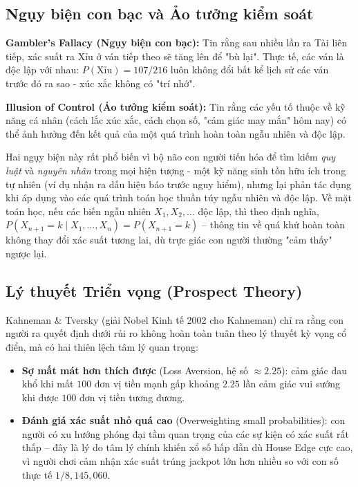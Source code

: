 \documentclass[12pt,a4paper]{article}
\theoremstyle{coloredthm}
\theoremstyle{coloreddef}
\theoremstyle{remark}
\begin{document}
\subsection{Ngụy biện con bạc và Ảo tưởng kiểm soát}

\textbf{Gambler's Fallacy (Ngụy biện con bạc):} Tin rằng sau nhiều lần ra Tài liên tiếp, xác suất ra Xỉu ở ván tiếp theo sẽ tăng lên để "bù lại". Thực tế, các ván là độc lập với nhau: $P(\text{Xỉu}) = 107/216$ luôn không đổi bất kể lịch sử các ván trước đó ra sao - xúc xắc không có "trí nhớ".

\textbf{Illusion of Control (Ảo tưởng kiểm soát):} Tin rằng các yếu tố thuộc về kỹ năng cá nhân (cách lắc xúc xắc, cách chọn số, "cảm giác may mắn" hôm nay) có thể ảnh hưởng đến kết quả của một quá trình hoàn toàn ngẫu nhiên và độc lập.

\begin{giaithich}
Hai ngụy biện này rất phổ biến vì bộ não con người tiến hóa để tìm kiếm \emph{quy luật} và \emph{nguyên nhân} trong mọi hiện tượng - một kỹ năng sinh tồn hữu ích trong tự nhiên (ví dụ nhận ra dấu hiệu báo trước nguy hiểm), nhưng lại phản tác dụng khi áp dụng vào các quá trình toán học thuần túy ngẫu nhiên và độc lập. Về mặt toán học, nếu các biến ngẫu nhiên $X_1, X_2, \dots$ độc lập, thì theo định nghĩa, $P(X_{n+1} = k \mid X_1, \dots, X_n) = P(X_{n+1}=k)$ -- thông tin về quá khứ hoàn toàn không thay đổi xác suất tương lai, dù trực giác con người thường "cảm thấy" ngược lại.
\end{giaithich}

\subsection{Lý thuyết Triển vọng (Prospect Theory)}

Kahneman \& Tversky (giải Nobel Kinh tế 2002 cho Kahneman) chỉ ra rằng con người ra quyết định dưới rủi ro không hoàn toàn tuân theo lý thuyết kỳ vọng cổ điển, mà có hai thiên lệch tâm lý quan trọng:
\begin{itemize}
    \item \textbf{Sợ mất mát hơn thích được} (Loss Aversion, hệ số $\approx 2.25$): cảm giác đau khổ khi mất $100$ đơn vị tiền mạnh gấp khoảng $2.25$ lần cảm giác vui sướng khi được $100$ đơn vị tiền tương đương.
    \item \textbf{Đánh giá xác suất nhỏ quá cao} (Overweighting small probabilities): con người có xu hướng phóng đại tầm quan trọng của các sự kiện có xác suất rất thấp -- đây là lý do tâm lý chính khiến xổ số hấp dẫn dù House Edge cực cao, vì người chơi cảm nhận xác suất trúng jackpot lớn hơn nhiều so với con số thực tế $1/8{,}145{,}060$.
\end{itemize}
\end{document}
